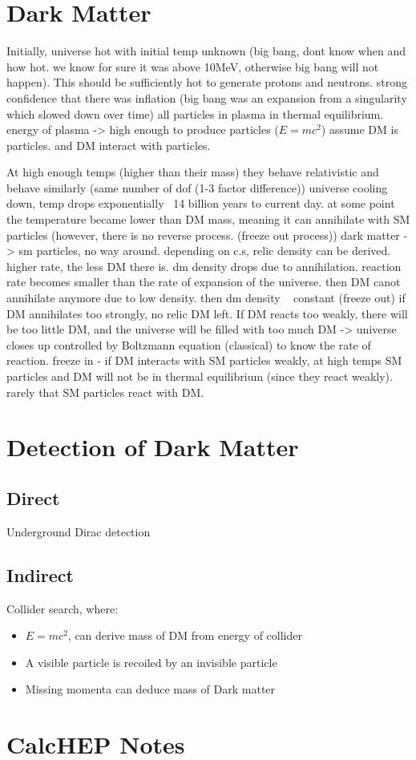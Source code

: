 \documentclass[11pt,a4paper]{article}
\begin{document}
\section{Dark Matter}
Initially, universe hot with initial temp unknown (big bang, dont know when and how hot. we know for sure it was above 10MeV, otherwise big bang will not happen). This
should be sufficiently hot to generate protons and neutrons.
strong confidence that there was inflation (big bang was an expansion from a singularity which slowed down over time)
all particles in plasma in thermal equilibrium. energy of plasma -> high enough to produce particles ($E = mc^2$)
assume DM is particles. and DM interact with particles. 

At high enough temps (higher than their mass) they behave relativistic and behave similarly (same number of dof (1-3 factor difference))
universe cooling down, temp drops exponentially ~14 billion years to current day.
at some point the temperature became lower than DM mass, meaning it can annihilate with SM particles (however, there is no reverse process. (freeze out process))
dark matter -> sm particles, no way around. depending on c.s, relic density can be derived. higher rate, the less DM there is.
dm density drops due to annihilation. reaction rate becomes smaller than the rate of expansion of the universe. then DM canot annihilate anymore due to low density. then dm density ~ constant (freeze out)
if DM annihilates too strongly, no relic DM left. If DM reacts too weakly, there will be too little DM, and the universe will be filled with too much DM -> universe closes up
controlled by Boltzmann equation (classical) to know the rate of reaction. 
freeze in - if DM interacts with SM particles weakly, at high temps SM particles and DM will not be in thermal equilibrium (since they react weakly). rarely that SM particles react with DM. 

\section{Detection of Dark Matter}
\subsection{Direct}
Underground Dirac detection
\subsection{Indirect}
Collider search, where:
\begin{itemize}
    \item $E = mc^2$, can derive mass of DM from energy of collider
    \item A visible particle is recoiled by an invisible particle
    \item Missing momenta can deduce mass of Dark matter
\end{itemize}
\section{}


\section{CalcHEP Notes}
\end{document}
